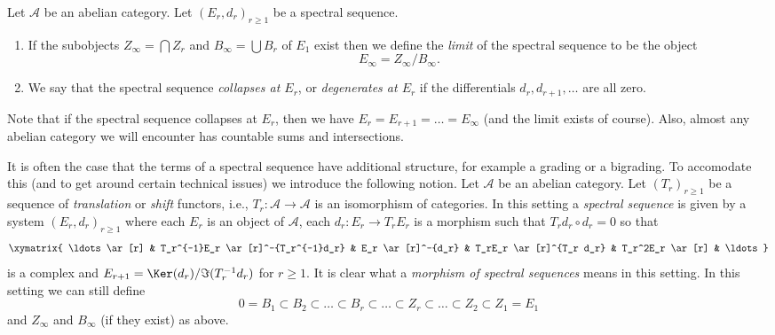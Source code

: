 \begin{definition}
\label{definition-limit-spectral-sequence}
Let $\mathcal{A}$ be an abelian category.
Let $(E_r, d_r)_{r \geq 1}$ be a spectral sequence.
\begin{enumerate}
\item If the subobjects $Z_{\infty} = \bigcap Z_r$
and $B_{\infty} = \bigcup B_r$ of $E_1$ exist then we define
the {\it limit} of the spectral sequence to be the object
$$
E_{\infty} = Z_{\infty}/B_{\infty}.
$$
\item We say that the spectral sequence {\it collapses at $E_r$}, or
{\it degenerates at $E_r$} if the differentials $d_r, d_{r + 1}, \ldots$ are
all zero.
\end{enumerate}
\end{definition}

\noindent
Note that if the spectral sequence collapses at $E_r$, then
we have $E_r = E_{r + 1} = \ldots = E_{\infty}$ (and the limit
exists of course). Also, almost any abelian category we will encounter
has countable sums and intersections.

\begin{remark}[Variant]
\label{remark-allow-translation-functors}
It is often the case that the terms of a spectral sequence have
additional structure, for example a grading or a bigrading.
To accomodate this (and to get around certain technical issues)
we introduce the following notion. Let $\mathcal{A}$ be an
abelian category. Let $(T_r)_{r \geq 1}$ be a
sequence of {\it translation} or {\it shift} functors, i.e.,
$T_r : \mathcal{A} \to \mathcal{A}$ is an isomorphism of categories.
In this setting a {\it spectral sequence} is given by a system
$(E_r, d_r)_{r \geq 1}$ where each $E_r$ is an object of
$\mathcal{A}$, each $d_r : E_r \to T_rE_r$
is a morphism such that $T_rd_r \circ d_r = 0$ so that
$$
\xymatrix{
\ldots \ar[r] &
T_r^{-1}E_r \ar[r]^-{T_r^{-1}d_r} &
E_r \ar[r]^-{d_r} &
T_rE_r \ar[r]^{T_r d_r} &
T_r^2E_r \ar[r] & \ldots
}
$$
is a complex and $E_{r + 1} = \Ker(d_r)/\Im(T_r^{-1}d_r)$ for $r \geq 1$.
It is clear what a {\it morphism of spectral sequences}
means in this setting. In this setting we can still define
$$
0 = B_1 \subset B_2 \subset \ldots \subset B_r \subset \ldots
\subset Z_r \subset \ldots \subset Z_2 \subset Z_1 = E_1
$$
and $Z_\infty$ and $B_\infty$ (if they exist) as above.
\end{remark}










